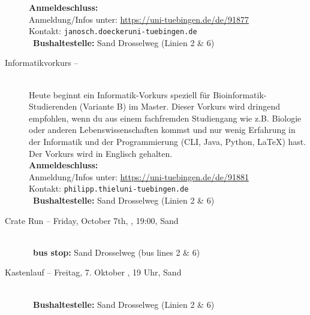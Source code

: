 \begin{description}
	\textbf{Anmeldeschluss:} \matheanmeldung\YEAR\\
	Anmeldung/Infos unter:  \url{https://uni-tuebingen.de/de/91877}\\
	Kontakt: \texttt{janosch.doecker\At uni-tuebingen.de}\\
	\ifsommersemester
	~\textbf{Bushaltestelle:} Sand Drosselweg (Linien 2 \& 6) 
	\fi
\fi

\ifmaster
    \ifbinfo
        \item[Informatikvorkurs -- \bioinfoDatum~\YEAR]\ \\
            Heute beginnt ein Informatik-Vorkurs speziell für Bioinformatik-Studierenden (Variante B) im Master. Dieser Vorkurs wird dringend empfohlen, wenn du aus einem fachfremden Studiengang wie z.B. Biologie oder anderen Lebenswissenschaften kommst und nur wenig Erfahrung in der Informatik und der Programmierung (CLI, Java, Python, \LaTeX) hast. Der Vorkurs wird in Englisch gehalten. \\
            \textbf{Anmeldeschluss:} \bioinfoAnmeldung\YEAR\\
            Anmeldung/Infos unter: \url{https://uni-tuebingen.de/de/91881}\\
            Kontakt: \texttt{philipp.thiel\At uni-tuebingen.de}\\
        ~\textbf{Bushaltestelle:} Sand Drosselweg (Linien 2 \& 6)
    \fi
\fi


\ifml
	\item[Crate Run -- Friday, October 7th, \YEAR, 19:00, Sand]~\\
	~\textbf{bus stop:} Sand Drosselweg (bus lines 2 \& 6)
\else
	\item[Kastenlauf -- Freitag, 7. Oktober \YEAR, 19 Uhr, Sand]~\\

	~\textbf{Bushaltestelle:} Sand Drosselweg (Linien 2 \& 6)
\fi



\end{description}
